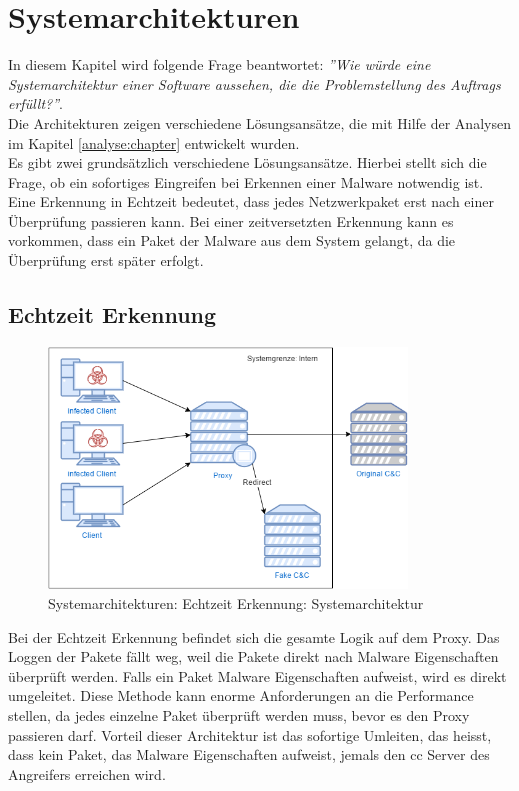 \chapter{Systemarchitekturen}
\label{arch:chapter}
In diesem Kapitel wird folgende Frage beantwortet: \textit{''Wie würde eine Systemarchitektur einer Software aussehen, die die Problemstellung des Auftrags erfüllt?''}.\\

Die Architekturen zeigen verschiedene Lösungsansätze, die mit Hilfe der Analysen im Kapitel \ref{analyse:chapter} entwickelt wurden.\\

Es gibt zwei grundsätzlich verschiedene Lösungsansätze. Hierbei stellt sich die Frage, ob ein sofortiges Eingreifen bei Erkennen einer Malware notwendig ist. Eine Erkennung in Echtzeit bedeutet, dass jedes Netzwerkpaket erst nach einer Überprüfung passieren kann. Bei einer zeitversetzten Erkennung kann es vorkommen, dass ein Paket der Malware aus dem System gelangt, da die Überprüfung erst später erfolgt.


\section{Echtzeit Erkennung}

\begin{figure}[H]
	\centering
	\includegraphics[width=0.85\textwidth]{img/Architektur-EE-A.png}
	\caption{Systemarchitekturen: Echtzeit Erkennung: Systemarchitektur}
	\label{fig:Echtzeit Erkennung: Systemarchitektur}
\end{figure}

Bei der Echtzeit Erkennung befindet sich die gesamte Logik auf dem Proxy. Das Loggen der Pakete fällt weg, weil die Pakete direkt nach Malware Eigenschaften überprüft werden. Falls ein Paket Malware Eigenschaften aufweist, wird es direkt umgeleitet. Diese Methode kann enorme Anforderungen an die Performance stellen, da jedes einzelne Paket überprüft werden muss, bevor es den Proxy passieren darf. Vorteil dieser Architektur ist das sofortige Umleiten, das heisst, dass kein Paket, das Malware Eigenschaften aufweist, jemals den \gls{cc} Server des Angreifers erreichen wird.


